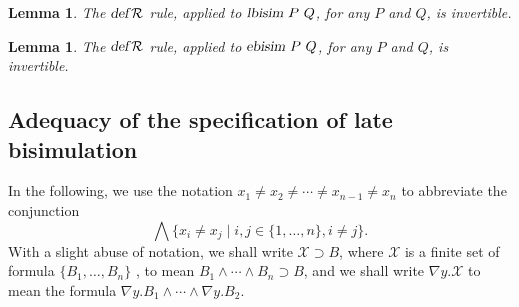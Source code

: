 \documentclass{acmtrans2m}
\newtheorem{lemma}[theorem]{Lemma}
\def\Xscr{{\mathcal X}}
\newcommand{\ebisim}[2]{\hbox{\sl ebisim}~#1~#2}
\newcommand{\lbisim}[2]{\hbox{\sl lbisim}~#1~#2}
\newcommand{\defR}{\hbox{\sl def\/{}}{\cal R}}
\newcommand{\oimp}{\supset}
\begin{document}
\begin{lemma}
\label{lm:lbisim-inv}
The $\defR$ rule, applied to $\lbisim P Q$, for any $P$ and $Q$, is
invertible. 
\end{lemma}

\begin{lemma}
\label{lm:ebisim-inv}
The $\defR$ rule, applied to $\ebisim P Q$, for any $P$ and $Q$, is
invertible. 
\end{lemma}

\subsection{Adequacy of the specification of late bisimulation}

In the following, we use the notation
$x_1 \not = x_2 \not = \cdots \not = x_{n-1}\not  = x_n$ to abbreviate the conjunction
$$
\bigwedge \{ x_i \not = x_j \mid i, j\in \{1,\ldots,n\},  i \not = j \}.
$$
With a slight abuse of notation, we shall write $\Xscr \oimp B$,
where $\Xscr$ is a finite set of formula $\{B_1, \ldots, B_n \}$ , to mean 
$B_1 \land \cdots \land B_n \oimp B$, and we shall write $\nabla y. \Xscr$ to mean the formula
$\nabla y.B_1 \land \cdots \land \nabla y.B_2.$
\end{document}
